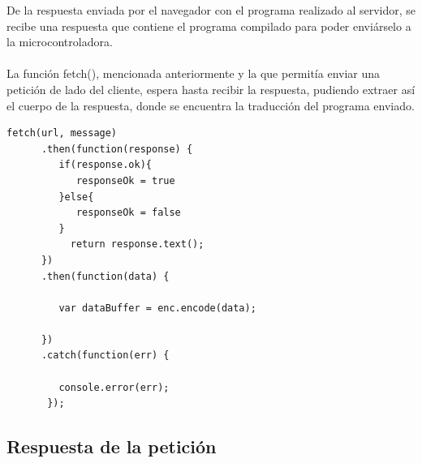 \documentclass{report}
\begin{document}
De la respuesta enviada por el navegador con el programa realizado al servidor, se recibe una respuesta que contiene el programa compilado para poder enviárselo a la microcontroladora.
\\
\\
La función fetch(), mencionada anteriormente y la que permitía enviar una petición de lado del cliente, espera hasta recibir la respuesta, pudiendo extraer así el cuerpo de la respuesta, donde se encuentra la traducción del programa enviado.
\\
\begin{lstlisting}[frame=single,breaklines=true, label="Extracción del dato enviado en la respuesta", caption="Extracción del dato enviado en la respuesta", captionpos=b]
   fetch(url, message)
      .then(function(response) {
         if(response.ok){
            responseOk = true
         }else{
            responseOk = false
         }
           return response.text();
      })
      .then(function(data) {
        
         var dataBuffer = enc.encode(data);
           
      })
      .catch(function(err) {

         console.error(err);
       });

\end{lstlisting}

\subsection{Respuesta de la petición}
\end{document}
